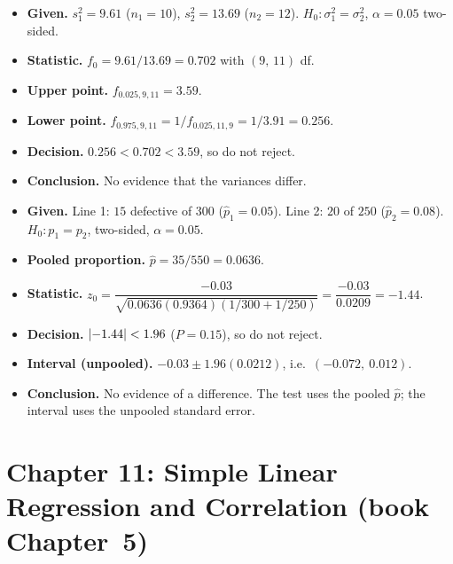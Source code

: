\begin{example}
\begin{itemize}
  \item \textbf{Given.} $s_1^2=9.61$ ($n_1=10$), $s_2^2=13.69$ ($n_2=12$). $H_0:\sigma_1^2=\sigma_2^2$, $\alpha=0.05$ two-sided.
  \item \textbf{Statistic.} $f_0=9.61/13.69=0.702$ with $(9,\,11)$ df.
  \item \textbf{Upper point.} $f_{0.025,9,11}=3.59$.
  \item \textbf{Lower point.} $f_{0.975,9,11}=1/f_{0.025,11,9}=1/3.91=0.256$.
  \item \textbf{Decision.} $0.256<0.702<3.59$, so do not reject.
  \item \textbf{Conclusion.} No evidence that the variances differ.
\end{itemize}
\end{example}

\begin{example}
\begin{itemize}
  \item \textbf{Given.} Line 1: $15$ defective of $300$ ($\hat{p}_1=0.05$). Line 2: $20$ of $250$ ($\hat{p}_2=0.08$). $H_0:p_1=p_2$, two-sided, $\alpha=0.05$.
  \item \textbf{Pooled proportion.} $\hat{p}=35/550=0.0636$.
  \item \textbf{Statistic.} $z_0=\dfrac{-0.03}{\sqrt{0.0636(0.9364)(1/300+1/250)}}=\dfrac{-0.03}{0.0209}=-1.44$.
  \item \textbf{Decision.} $\lvert-1.44\rvert<1.96$ ($P=0.15$), so do not reject.
  \item \textbf{Interval (unpooled).} $-0.03\pm1.96(0.0212)$, i.e.\ $(-0.072,\ 0.012)$.
  \item \textbf{Conclusion.} No evidence of a difference. The test uses the pooled $\hat{p}$; the interval uses the unpooled standard error.
\end{itemize}
\end{example}

\section{Chapter 11: Simple Linear Regression and Correlation (book Chapter~5)}

